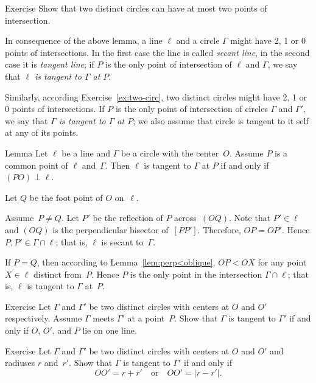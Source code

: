 \begin{thm}{Exercise}\label{ex:two-circ}
Show that two distinct circles can have at most two points of intersection.
\end{thm}

In consequence of the above lemma, 
a line $\ell$ and a circle $\Gamma$ might have 2, 1 or 0 points of intersections.
In the first case the line is called \emph{secant line}, in the second case it is \emph{tangent line};
if $P$ is the only point of intersection of $\ell$ and $\Gamma$,
we say that {}\emph{$\ell$ is tangent to $\Gamma$ at $P$}. 

Similarly, according Exercise~\ref{ex:two-circ},
two distinct circles might have 2, 1 or 0 points of intersections.
If $P$ is the only point of intersection of circles $\Gamma$ and $\Gamma'$,
we say that \emph{$\Gamma$ is tangent to $\Gamma$ at $P$}; we also assume that circle is tangent to it self at any of its points.

\begin{thm}[\abs]{Lemma}\label{lem:tangent}
Let $\ell$ be a line and $\Gamma$ be a circle with the center~$O$.
Assume $P$ is a common point of $\ell$ and~$\Gamma$. 
Then $\ell$ is tangent to $\Gamma$ at $P$ if and only if $(PO)\perp \ell$.
\end{thm}

Let $Q$ be the foot point of $O$ on~$\ell$.

Assume~$P\ne Q$.
Let $P'$ be the reflection of $P$ across~$(OQ)$.
Note that $P'\in\ell$ and $(OQ)$ is the perpendicular bisector of~$[PP']$.
Therefore, $OP=OP'$.
Hence $P,P'\in \Gamma\cap \ell$;
that is, $\ell$ is secant to~$\Gamma$.

If $P=Q$, 
then according to Lemma~\ref{lem:perp<oblique},
$OP<OX$ for any point $X\in \ell$ distinct from~$P$.
Hence $P$ is the only point in the intersection $\Gamma\cap\ell$;
that is, $\ell$ is tangent to $\Gamma$ at~$P$. 
\qeds

\begin{thm}{Exercise}\label{ex:tangent-circles}
Let $\Gamma$ and $\Gamma'$ be two distinct circles with centers at $O$ and $O'$ respectively. 
Assume $\Gamma$ meets $\Gamma'$ at a point~$P$.
Show that $\Gamma$ is tangent to $\Gamma'$ if and only if $O$, $O'$, and $P$ lie on one line.
\end{thm}

\begin{thm}{Exercise}\label{ex:tangent-circles-2}
Let $\Gamma$ and $\Gamma'$ be two distinct circles with centers at $O$ and $O'$ and radiuses $r$ and~$r'$.
Show that $\Gamma$ is tangent to $\Gamma'$ if and only if
$$OO'=r+r'
\quad
\text{or}\quad
OO'=|r-r'|.$$

\end{thm}

